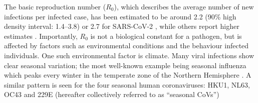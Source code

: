 \documentclass[rmp, reprint, superscriptaddress, floatfix,amsmath]{revtex4-1}
\newcommand{\Robert}[1]{{\color{celestialblue}Robert: #1}}
\newcommand{\Jan}[1]{{\color{deepsaffron}Jan: #1}}
\begin{document}


The basic reproduction number ($R_0$), which describes the average number of new infections per infected case, has been estimated to be around 2.2 (90\% high density interval: 1.4–3.8) or 2.7 for SARS-CoV-2 \citep{Riou2020pattern,wu_nowcasting_2020}, while others report higher estimates \citep{yang_epidemiological_2020}. Importantly, $R_0$ is not a biological constant for a pathogen, but is affected by factors such as environmental conditions and the behaviour infected individuals. One such environmental factor is climate. Many viral infections show clear seasonal variation; the most well-known example being seasonal influenza which peaks every winter in the temperate zone of the Northern Hemisphere \citep{petrova_evolution_2018}. 
A similar pattern is seen for the four seasonal human coronaviruses: HKU1, NL63, OC43 and 229E (hereafter collectively referred to as ``seasonal CoVs'') \citep{killerby2018human} %
\citep{goes2019typical} %
\citep{galanti2019longitudinal} %
\citep{friedman2018human} %
\citep{al2016diversity} %
\citep{huang2017epidemiology} %
\end{document}
